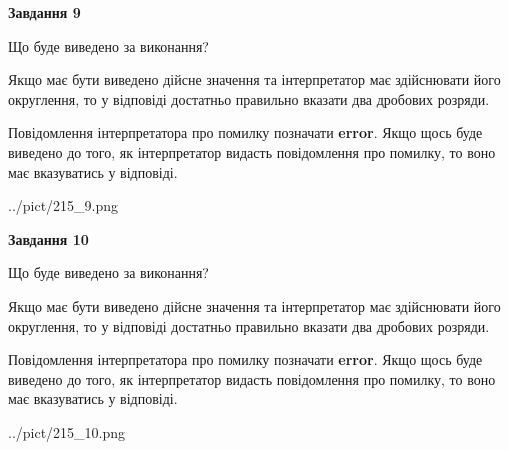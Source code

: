 \documentclass[12pt, ukrainian]{article}
\begin{document}
{\begin {Large}
{\begin {center}\textbf{Завдання 9}\end {center}}\par
Що буде виведено за виконання? \par

Якщо має бути виведено дійсне значення та інтерпретатор має здійснювати його округлення, 
то у відповіді достатньо правильно вказати два дробових розряди.

Повідомлення інтерпретатора про помилку позначати \textbf{error}.
Якщо щось буде виведено до того, як інтерпретатор видасть повідомлення про помилку, 
то воно має вказуватись у відповіді. \par

\begin{center}
	{../pict/215_9.png}
\end{center}
\newpage

{\begin {center}\textbf{Завдання 10}\end {center}}\par
Що буде виведено за виконання? \par

Якщо має бути виведено дійсне значення та інтерпретатор має здійснювати його округлення, 
то у відповіді достатньо правильно вказати два дробових розряди.

Повідомлення інтерпретатора про помилку позначати \textbf{error}.
Якщо щось буде виведено до того, як інтерпретатор видасть повідомлення про помилку, 
то воно має вказуватись у відповіді. \par

\begin{center}
	{../pict/215_10.png}
\end{center}
\newpage

\end {Large}}
\end{document}
